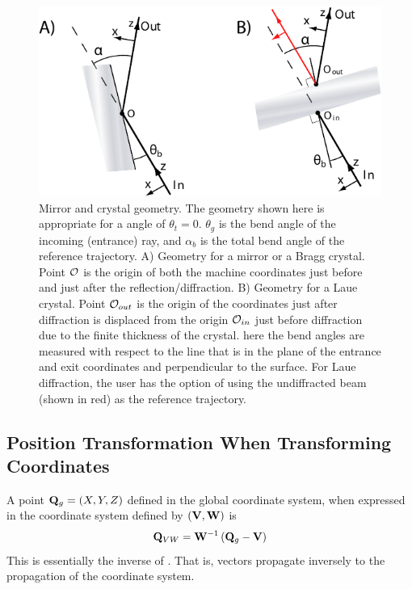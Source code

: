 \begin{figure}
  \centering \includegraphics{mirror.pdf} 
\caption[Mirror and crystal geometry] {Mirror and crystal geometry.  The geometry shown here is
appropriate for a  angle of $\theta_t = 0$.  $\theta_g$ is the bend angle of the
incoming (entrance) ray, and $\alpha_b$ is the total bend angle of the reference trajectory. A)
Geometry for a mirror or a Bragg crystal. Point ${\cal O}$ is the origin of both the machine coordinates
just before and just after the reflection/diffraction. B) Geometry for a Laue crystal.  Point
${\cal O}_{out}$ is the origin of the coordinates just after diffraction is displaced from the origin
${\cal O}_{in}$ just before diffraction due to the finite thickness of the crystal. here the bend
angles are measured with respect to the line that is in the plane of the entrance and exit
coordinates and perpendicular to the surface. For Laue diffraction, the user has the option of using
the undiffracted beam (shown in red) as the reference trajectory.
  }  
  \label{f:mirror}
\end{figure}

\subsection{Position Transformation When Transforming Coordinates}
\label{s:pos.trans}

A point ${\bf Q}_g = (X, Y, Z)$ defined in the global coordinate system, when expressed in the
coordinate system defined by $({\bf V}, {\bf W})$ is
\begin{equation}
  {\bf Q}_{VW} = {\bf W}^{-1} \left( {\bf Q}_g - {\bf V} \right)
  \label{rwrv}
\end{equation}
This is essentially the inverse of . That is, vectors propagate inversely to the
propagation of the coordinate system.

